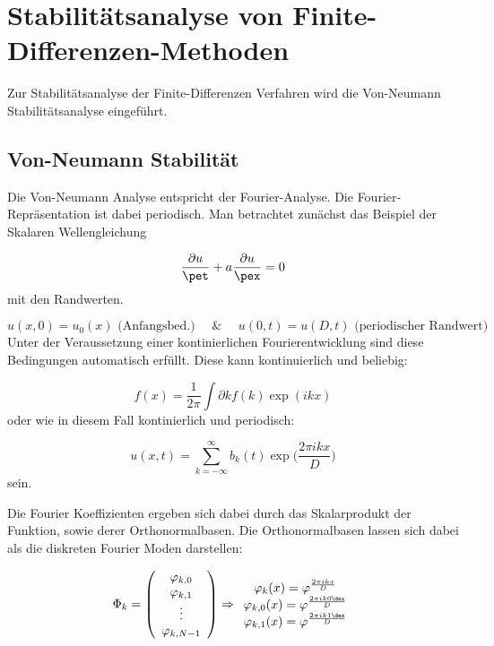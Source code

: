 \section{Stabilit\"atsanalyse von Finite-Differenzen-Methoden}
Zur Stabilit\"atsanalyse der Finite-Differenzen Verfahren wird die Von-Neumann Stabilit\"atsanalyse eingef\"uhrt.

\subsection{Von-Neumann Stabilit\"at}
Die Von-Neumann Analyse entspricht der Fourier-Analyse. Die Fourier-Repr\"asentation ist dabei periodisch. Man betrachtet zun\"achst das Beispiel der Skalaren Wellengleichung
\par
\begin{equation*}
	\frac{\partial u}{\pet} + a\frac{\partial u}{\pex} = 0
\end{equation*}
mit den Randwerten.
\par
\begin{equation*}
	u(x,0) = u_0(x) \textrm{ (Anfangsbed.)~~~~\&~~~~} u(0,t) = u(D,t)\textrm{ (periodischer Randwert) }
\end{equation*}
Unter der Veraussetzung einer kontinierlichen Fourierentwicklung sind diese Bedingungen automatisch erf\"ullt. Diese kann kontinuierlich und beliebig:
\par
\begin{equation*}
	f(x) = \frac{1}{2\pi} \int \partial k f(k) \exp(ikx)
\end{equation*}
oder wie in diesem Fall kontinierlich und periodisch:
\par
\begin{equation*}
	u(x,t) = \sum_{k=-\infty}^\infty b_k(t) \exp\big(\frac{2\pi ikx}{D}\big)
\end{equation*}
sein.
\par
Die Fourier Koeffizienten ergeben sich dabei durch das Skalarprodukt der Funktion, sowie derer Orthonormalbasen. Die Orthonormalbasen lassen sich dabei als die diskreten Fourier Moden darstellen:
\par
\begin{equation*}
	\Phi_k =\left(\begin{array}{c}\varphi_{k,0}\\\varphi_{k,1}\\\vdots\\ \varphi_{k,N-1}\end{array}\right) \Rightarrow \begin{array}{c} \varphi_{k}(x) = \varphi^{\frac{2\pi i k x}{D}}\\ \varphi_{k,0}(x) = \varphi^{\frac{2\pi i k 0 \dex}{D}}\\ \varphi_{k,1}(x) = \varphi^{\frac{2\pi i k 1 \dex}{D}}\\\end{array}
\end{equation*}
